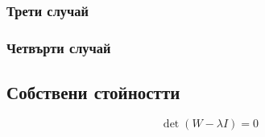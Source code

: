 \documentclass[a4paper,fleqn,12pt]{article}
\begin{document}
\subsubsection{Трети случай}
\subsubsection{Четвърти случай}

\subsection{Собствени стойностти}
$$\det(W-\lambda I) = 0$$
\end{document}
